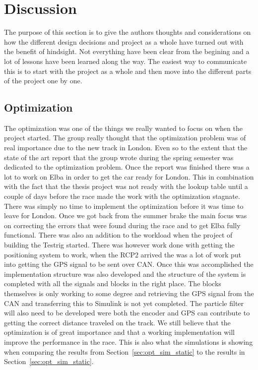 \chapter{Discussion}
The purpose of this section is to give the authors thoughts and considerations
on how the different design decisions and project as a whole have turned out
with the benefit of hindsight. Not everything have been clear from the begining
and a lot of lessons have been learned along the way. The easiest way to
communicate this is to start with the project as a whole and then move into the
different parts of the project one by one. 
\section{Optimization}
The optimization was one of the things we really wanted to focus on when the
project started. The group really thought that the optimization problem was of
real importance due to the new track in London. Even so to the extent that the
state of the art report that the group wrote during the spring semester was
dedicated to the optimization problem. Once the report was finished there was a
lot to work on Elba in order to get the car ready for London. This in
combination with the fact that the thesis project was not ready with the lookup
table until a couple of days before the race made the work with the optimization
stagnate. There was simply no time to implement the optimization before it was
time to leave for London. Once we got back from the summer brake the main focus
was on correcting the errors that were found during the race and to get Elba
fully functional. There was also an addition to the workload when the project of
building the Testrig started. There was however work done with getting the
positioning system to work, when the RCP2 arrived the was a lot of work put into
getting the GPS signal to be sent over CAN\@. Once this was accomplished the
implementation structure was also developed and the structure of the system is
completed with all the signals and blocks in the right place.  The blocks
themselves is only working to some degree and retrieving the GPS signal from the
CAN and transferring this to Simulink is not yet completed. The particle filter
will also need to be developed were both the encoder and GPS can contribute to
getting the correct distance traveled on the track. We still believe that the
optimization is of great importance and that a working implementation will
improve the performance in the race. This is also what the simulations is
showing when comparing the results from Section~\ref{sec:opt_sim_static} to the
results in Section~\ref{sec:opt_sim_static}.
